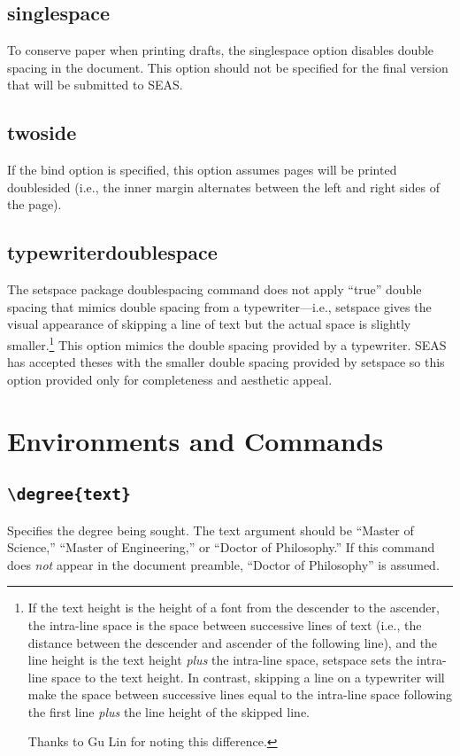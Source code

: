 \documentclass[10pt]{article}
\newcommand{\package}[1]{#1}
\newcommand{\option}[1]{#1}
\newcommand{\command}[1]{\texttt{\textbackslash#1}}
\begin{document}
\subsection{\option{singlespace}}
To conserve paper when printing drafts, the singlespace option disables double spacing in the document.
This option should not be specified for the final version that will be submitted to \gls{SEAS}.

\subsection{\option{twoside}}
If the bind option is specified, this option assumes pages will be printed doublesided (i.e., the inner margin alternates between the left and right sides of the page).

\subsection{\option{typewriterdoublespace}}
The \package{setspace} package doublespacing command does not apply ``true'' double spacing that mimics double spacing from a typewriter---i.e., \package{setspace} gives the visual appearance of skipping a line of text but the actual space is slightly smaller.\footnote{
  If the text height is the height of a font from the descender to the ascender, the intra-line space is the space between successive lines of text (i.e., the distance between the descender and ascender of the following line), and the line height is the text height \emph{plus} the intra-line space, \package{setspace} sets the intra-line space to the text height.
  In contrast, skipping a line on a typewriter will make the space between successive lines equal to the intra-line space following the first line \emph{plus} the line height of the skipped line.

  Thanks to Gu Lin for noting this difference.
}
This option mimics the double spacing provided by a typewriter.
\Gls{SEAS} has accepted theses with the smaller double spacing provided by \package{setspace} so this option provided only for completeness and aesthetic appeal.

\section{Environments and Commands}

\subsection{\command{degree\{text\}}}
Specifies the degree being sought.
The text argument should be ``Master of Science,'' ``Master of Engineering,'' or ``Doctor of Philosophy.''
If this command does \emph{not} appear in the document preamble, ``Doctor of Philosophy'' is assumed.
\end{document}
